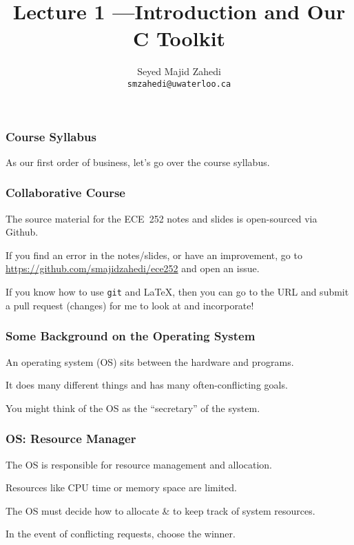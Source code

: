 

\title{Lecture 1 ---Introduction and Our C Toolkit }

\author{Seyed Majid Zahedi \\ \small \texttt{smzahedi@uwaterloo.ca}}
\date{}




\begin{frame}
	\titlepage

\end{frame}

\begin{frame}
	\frametitle{Course Syllabus}

	As our first order of business, let's go over the course syllabus.

\end{frame}

\begin{frame}
	\frametitle{Collaborative Course}

	The source material for the ECE~252 notes and slides is open-sourced via Github.

	If you find an error in the notes/slides, or have an improvement, go to \url{https://github.com/smajidzahedi/ece252} and open an issue.

	If you know how to use \texttt{git} and \LaTeX, then you can go to the URL and submit a pull request (changes) for me to look at and incorporate!


\end{frame}

\begin{frame}
	\frametitle{Some Background on the Operating System}

	An operating system (OS) sits between the hardware and programs.

	It does many different things and has many often-conflicting goals.

	You might think of the OS as the ``secretary'' of the system.

\end{frame}

\begin{frame}
	\frametitle{OS: Resource Manager}

	The OS is responsible for resource management and allocation.

	Resources like CPU time or memory space are limited.

	The OS must decide how to allocate \& to keep track of system resources.

	In the event of conflicting requests, choose the winner.


\end{frame}

